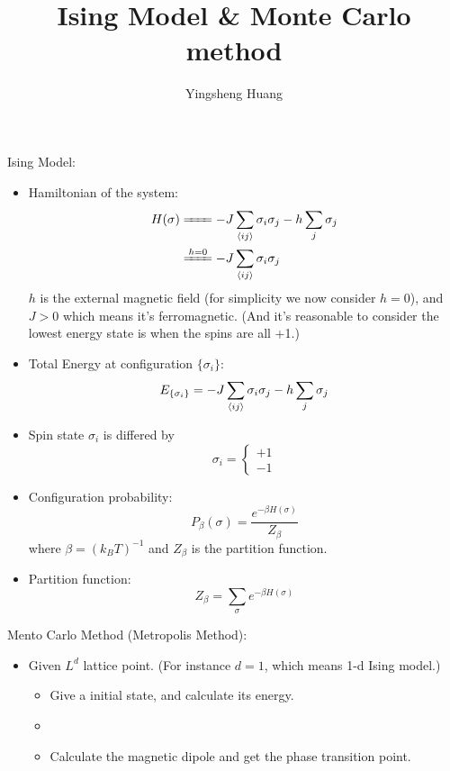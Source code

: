\documentclass{article}
\title{Ising Model \& Monte Carlo method}
\author{Yingsheng Huang}
\newcommand{\s}{\sigma}
\begin{document}
\maketitle
Ising Model:
\begin{itemize}
  \item Hamiltonian of the system:
  \begin{align*}
    H(\sigma)&\xlongequal{\phantom{h=0}}-J\sum_{\expval{ij}}\sigma_i\sigma_j-h\sum_{j}\sigma_j\\
    &\xlongequal{h=0}-J\sum_{\expval{ij}}\sigma_i\sigma_j
  \end{align*}
  $h$ is the external magnetic field (for simplicity we now consider $h=0$), and $J>0$ which means it's ferromagnetic. (And it's reasonable to consider the lowest energy state is when the spins are all +1.)
  \item Total Energy at configuration $\{\sigma_i\}$:
  $$E_{\{\sigma_i\}}=-J\sum_{\expval{ij}}\sigma_i\sigma_j-h\sum_{j}\sigma_j$$
  \item Spin state $\sigma_i$ is differed by
  $$\sigma_i=\begin{cases}
  +1\\-1
  \end{cases}$$
  \item Configuration probability:
  $$P_{\beta}(\s)=\frac{e^{-\beta H(\s)}}{Z_{\beta}}$$
  where $\beta=(k_BT)^{-1}$ and $Z_{\beta}$ is the partition function.
  \item Partition function:
  $$Z_{\beta}=\sum_{\sigma}e^{-\beta H(\sigma)}$$




\end{itemize}
Mento Carlo Method (Metropolis Method):
\begin{itemize}
  \item Given $L^d$ lattice point. (For instance $d=1$, which means 1-d Ising model.)

  \begin{itemize}{(1)}
    \item Give a initial state, and calculate its energy.
    \item
    \item Calculate the magnetic dipole and get the phase transition point.
  \end{itemize}
\end{itemize}
\end{document}
